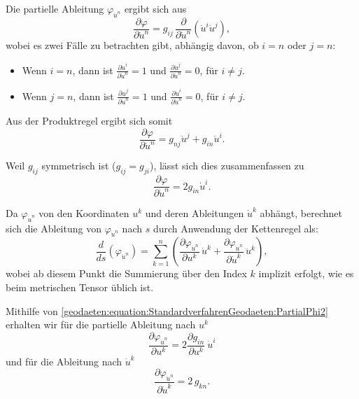 Die partielle Ableitung $\varphi_{\dot{u}^n}$ ergibt sich aus
\begin{equation}
	\frac{\partial \varphi}{\partial \dot{u}^n} = g_{ij} \, \frac{\partial}{\partial \dot{u}^n} \left( \dot{u}^i \dot{u}^j \right),
\end{equation}
wobei es zwei Fälle zu betrachten gibt, abhängig davon, ob $i = n$ oder $j = n$:
\begin{itemize}
	\item Wenn $i = n$, dann ist $\frac{\partial \dot{u}^i}{\partial \dot{u}^n} = 1$ und $\frac{\partial \dot{u}^j}{\partial \dot{u}^n} = 0$, für $i \neq j$.
	\item Wenn $j = n$, dann ist $\frac{\partial \dot{u}^j}{\partial \dot{u}^n} = 1$ und $\frac{\partial \dot{u}^i}{\partial \dot{u}^n} = 0$, für $i \neq j$.
\end{itemize}

Aus der Produktregel ergibt sich somit
\begin{equation}
	\frac{\partial \varphi}{\partial \dot{u}^n} = g_{nj} \dot{u}^j + g_{in} \dot{u}^i.
\end{equation}

Weil $g_{ij}$ symmetrisch ist ($g_{ij} = g_{ji}$), lässt sich dies zusammenfassen zu
\begin{equation}
	\frac{\partial \varphi}{\partial \dot{u}^n} = 2g_{in} \dot{u}^i.
	\label{geodaeten:equation:StandardverfahrenGeodaeten:PartialPhi2}
\end{equation}

Da $\varphi_{\dot{u}^n}$ von den Koordinaten $u^k$ und deren Ableitungen $\dot{u}^k$ abhängt, berechnet sich die Ableitung von $\varphi_{\dot{u}^n}$ nach $s$ durch Anwendung der Kettenregel als:
\begin{equation}
	\frac{d}{ds} \left( \varphi_{\dot{u}^n} \right) = \sum_{k = 1}^n \left( \frac{\partial \varphi_{\dot{u}^n}}{\partial u^k} \, \dot{u}^k + \frac{\partial \varphi_{\dot{u}^n}}{\partial \dot{u}^k} \, \ddot{u}^k \right),
	\label{geodaeten:equation:StandardverfahrenGeodaeten:Ableitung1s}
\end{equation}
wobei ab diesem Punkt die Summierung über den Index $k$ implizit erfolgt, wie es beim metrischen Tensor üblich ist.

Mithilfe von \eqref{geodaeten:equation:StandardverfahrenGeodaeten:PartialPhi2} erhalten wir für die partielle Ableitung nach $u^k$  
\begin{equation}
	\frac{\partial \varphi_{\dot{u}^n}}{\partial u^k} = 
	2 \frac{\partial g_{in}}{\partial u^k} \ \dot{u}^i
\end{equation}
und für die Ableitung nach $\dot{u}^k$
\begin{equation}
	\frac{\partial \varphi_{\dot{u}^n}}{\partial \dot{u}^k} = 
	2 \, g_{kn}.
\end{equation}

